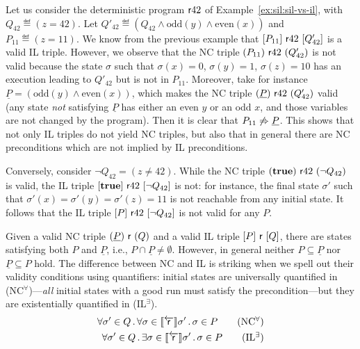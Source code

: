 \begin{example}
	Let us consider the deterministic program $\mathsf{r} 42$ of Example~\ref{ex:sil:sil-vs-il}, with $Q_{42} \eqdef (z=42)$.
	Let $Q'_{42} \eqdef (Q_{42} \wedge \text{odd}(y) \wedge \text{even}(x))$ and $P_{11} \eqdef (z = 11)$. We know from the previous example that $[P_{11}]~\mathsf{r} 42~[Q'_{42}]$ is a valid IL triple.
	However, we observe that the NC triple $(P_{11})~\mathsf{r} 42~(Q'_{42})$ is not valid because the state $\sigma$ such that $\sigma(x) = 0$, $\sigma(y) = 1$, $\sigma(z) = 10$ has an execution leading to $Q'_{42}$ but is not in $P_{11}$.
	Moreover, take for instance $\underline{P} = (\text{odd}(y) \land \text{even}(x))$, which makes the NC triple $(\underline{P})~\mathsf{r} 42~(Q'_{42})$ valid (any state \emph{not} satisfying $\underline{P}$ has either an even $y$ or an odd $x$, and those variables are not changed by the program). Then it is clear that $P_{11} \notimplies \underline{P}$. This shows that not only IL triples do not yield NC triples, but also that in general there are NC preconditions which are not implied by IL preconditions.

	Conversely, consider $\neg Q_{42} = (z \neq 42)$. While the NC triple $(\textbf{true})~\mathsf{r} 42~(\neg Q_{42})$ is valid, the IL triple $[\textbf{true}]~\mathsf{r} 42~[\neg Q_{42}]$ is not: for instance, the final state $\sigma'$ such that $\sigma'(x) = \sigma'(y) = \sigma'(z) = 11$ is not reachable from any initial state. It follows that the IL triple $[P]~\mathsf{r} 42~[\neg Q_{42}]$ is not valid for any $P$.
\end{example}

Given a valid NC triple $(\underline{P})~\mathsf{r}~(Q)$ and a valid IL triple $[P]~\mathsf{r}~[Q]$, there are states satisfying both $P$ and $\underline{P}$, i.e., $P \cap \underline{P} \neq \emptyset$. However, in general neither $P \subseteq \underline{P}$ nor $\underline{P} \subseteq P$ hold. The difference between NC and IL is striking when we spell out their validity conditions using quantifiers: initial states are universally quantified in (NC$^{\forall}$)---\emph{all} initial states with a good run must satisfy the precondition---but they are existentially quantified in (IL$^{\exists}$).
\begin{align*}
	\forall \sigma' \in Q \sdot \forall \sigma\in \bwsem{\regr}\sigma' \sdot\sigma\in P
	\tag{NC$^{\forall}$} \\
	\forall \sigma' \in Q \sdot \exists \sigma\in \bwsem{\regr}\sigma' \sdot \sigma \in P
	\tag{IL$^{\exists}$}
\end{align*}

